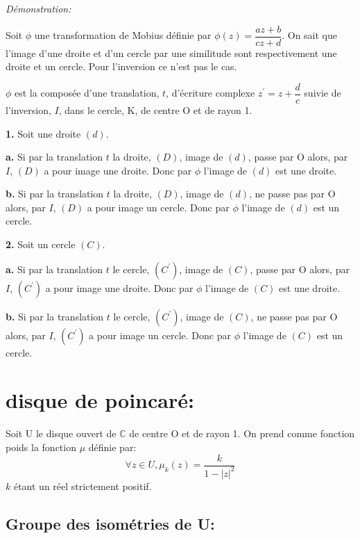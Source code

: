 \documentclass[a4paper, 12pt, twoside]{book}
\begin{document}
 \textit{Démonstration:}\
 
 Soit $\phi$ une transformation de Mobius définie par $\phi(z)=\dfrac{az+b}{cz+d}$. On sait que l'image d'une droite et d'un cercle par une similitude sont respectivement une droite et un cercle. Pour l'inversion ce n'est pas le cas.\
 
   $\phi$ est la composée d'une translation, $t$, d'écriture complexe $z^{'}=z+\dfrac{d}{c}$ suivie de l'inversion, $I$, dans le cercle, K, de centre O et de rayon 1.\
   
   
 
 \textbf{1.} Soit une droite $(d)$.\
 
 \textbf{a.} Si par la translation $t$ la droite, $(D)$, image de $(d)$, passe par O alors, par $I$, $(D)$ a pour image une droite. Donc par $\phi$ l'image de $(d)$ est une droite. 
 
 \textbf{b.}   Si par la translation $t$ la droite, $(D)$, image de $(d)$, ne passe pas par O alors, par $I$, $(D)$ a pour image un cercle. Donc par $\phi$ l'image de $(d)$ est un cercle.\
 
 \textbf{2.} Soit un cercle $(C)$.\
 
 \textbf{a.} Si par la translation $t$ le cercle, $(C^{'})$, image de $(C)$, passe par O alors, par $I$, $(C^{'})$ a pour image une droite. Donc par $\phi$ l'image de $(C)$ est une droite.\
 
  \textbf{b.}   Si par la translation $t$ le cercle, $(C^{'})$, image de $(C)$, ne passe pas par O alors, par $I$, $(C^{'})$ a pour image un cercle. Donc par $\phi$ l'image de $(C)$ est un cercle.\\   
 
 
   \chapter{disque de poincaré:}
   
   Soit U le disque ouvert de $\mathbb{C}$ de centre O et de rayon 1. On prend comme fonction poids la fonction $\mu$ définie par:\\
   
   $$\forall z \in U,\mu_{k}(z)=\dfrac{k}{1-|z|^{2}}$$ $k$ étant un réel strictement positif.\\

   \section{Groupe des isométries de U:}
   
\end{document}
